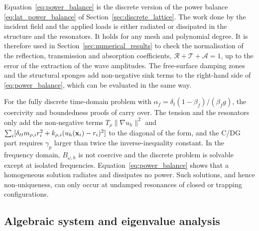 Equation~\eqref{eq:power_balance} is the discrete version of the power balance \eqref{eq:lat_power_balance} of Section~\ref{sec:discrete_lattice}. The work done by the incident field and the applied loads is either radiated or dissipated in the structure and the resonators. It holds for any mesh and polynomial degree. It is therefore used in Section~\ref{sec:numerical_results} to check the normalisation of the reflection, transmission and absorption coefficients, $\mathcal{R}+\mathcal{T}+\mathcal{A}=1$, up to the error of the extraction of the wave amplitudes. The free-surface damping zones and the structural sponges add non-negative sink terms to the right-hand side of \eqref{eq:power_balance}, which can be evaluated in the same way.

\begin{remark}\label{rem:well_posedness}
For the fully discrete time-domain problem with $\alpha_f=\delta_t(1-\beta_f)/(\beta_fg)$, the coercivity and boundedness proofs of \cite[Propositions~3--7]{colomes2023monolithic} carry over. The tension and the resonators only add the non-negative terms $T_\rho\|\nabla u_h\|^2$ and $\sum_i[\delta_{tt}m_{\rho,i}r_i^2+k_{\rho,i}(u_h(\mathbf{x}_i)-r_i)^2]$ to the diagonal of the form, and the C/DG part requires $\gamma_p$ larger than twice the inverse-inequality constant. In the frequency domain, $B_{\omega,h}$ is not coercive and the discrete problem is solvable except at isolated frequencies. Equation~\eqref{eq:power_balance} shows that a homogeneous solution radiates and dissipates no power. Such solutions, and hence non-uniqueness, can only occur at undamped resonances of closed or trapping configurations.
\end{remark}

\subsection{Algebraic system and eigenvalue analysis}\label{subsec:algebraic_system}\label{sec:modalAnalysis}

